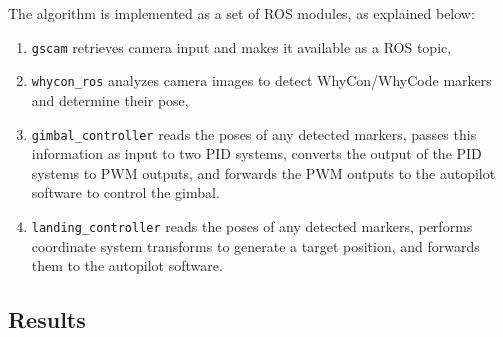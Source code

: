 The algorithm is implemented as a set of ROS modules, as explained below:
\begin{enumerate}
    \item \texttt{gscam} retrieves camera input and makes it available as a ROS topic,
    \item \texttt{whycon\_ros} analyzes camera images to detect WhyCon/WhyCode markers and determine their pose,
    \item \texttt{gimbal\_controller} reads the poses of any detected markers,
                                      passes this information as input to two PID systems,
                                      converts the output of the PID systems to PWM outputs,
                                      and forwards the PWM outputs to the autopilot software to control the gimbal.
    \item \texttt{landing\_controller} reads the poses of any detected markers,
                                        performs coordinate system transforms to generate a target position,
                                        and forwards them to the autopilot software.
\end{enumerate}

\subsection{Results}

